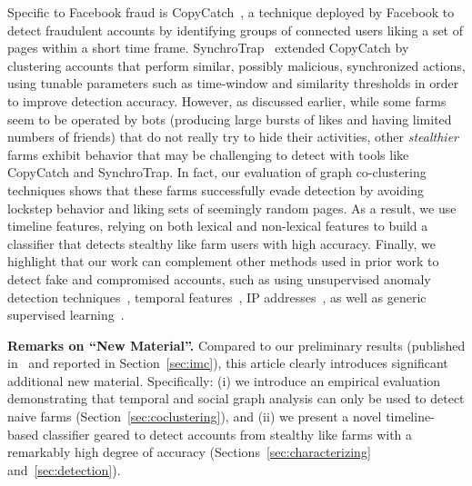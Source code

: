 \documentclass[twocolumn,10pt,letterpaper]{article}
\newcommand{\descr}[1]{\smallskip\noindent\textbf{#1}}
\begin{document}
%
Specific to Facebook fraud is CopyCatch~\cite{beutel2013copycatch},
a technique deployed by Facebook to detect fraudulent accounts by identifying groups of connected users liking a set of pages within a short time frame.
%
SynchroTrap~\cite{cao14synchrotrap} extended CopyCatch by clustering accounts that perform similar, possibly malicious, synchronized actions, using tunable parameters such as time-window and similarity thresholds in order to improve detection accuracy.
%
However, as discussed earlier, while some farms seem to be operated by bots (producing large bursts of likes and having limited numbers of friends) that do not really try to hide their activities, other {\em stealthier} farms exhibit behavior that may be challenging to detect with tools like CopyCatch and SynchroTrap.
%
In fact, our evaluation of graph co-clustering techniques shows that these farms successfully evade detection by avoiding lockstep behavior and liking sets of seemingly random pages.
%
As a result, we use timeline features, relying on both lexical and non-lexical features to build a classifier that detects stealthy like farm users with high accuracy.
%
Finally, we highlight that our work can complement other methods used in prior work to detect fake and compromised accounts, such as using unsupervised anomaly detection techniques~\cite{viswanath14tanomaloussocialnetwork}, temporal features~\cite{jiang14catchsyn,jiang14strangebehaviorosocial}, IP addresses~\cite{stringhini2015evilcohort},
as well as generic supervised learning~\cite{badri2016uncovering}.


%
\descr{Remarks on ``New Material''.} Compared to our preliminary results (published in~\cite{decristofaro14facebooklikefarms} and reported in Section~\ref{sec:imc}), this article clearly introduces significant additional new material. Specifically: (i) we introduce an empirical evaluation demonstrating that temporal and social graph analysis can only be used to detect naive farms (Section~\ref{sec:coclustering}), and
(ii) we present a novel timeline-based classifier geared to detect accounts from stealthy like farms with a remarkably high degree of accuracy (Sections~\ref{sec:characterizing} and~\ref{sec:detection}).
\end{document}
